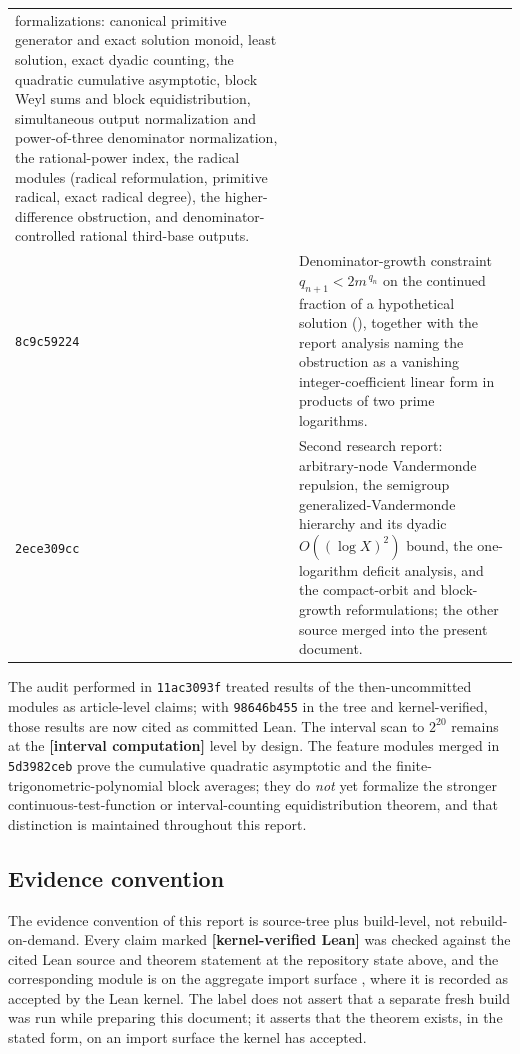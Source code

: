 \documentclass[11pt,oneside]{article}
\theoremstyle{definition}
\theoremstyle{remark}
\newcommand{\lean}[1]{\texttt{\detokenize{#1}}}
\newcommand{\commit}[1]{\texttt{#1}}
\newcommand{\statuslean}{\textcolor{leanblue}{\textbf{[kernel-verified Lean]}}}
\newcommand{\statuscomp}{\textcolor{computeviolet}{\textbf{[interval computation]}}}
\begin{document}
\begin{longtable}{@{}p{}p{}@{}}
formalizations: canonical primitive generator and exact solution monoid, least solution,
exact dyadic counting, the quadratic cumulative asymptotic, block Weyl sums and block
equidistribution, simultaneous output normalization and power-of-three denominator
normalization, the rational-power index, the radical modules (radical reformulation,
primitive radical, exact radical degree), the higher-difference obstruction, and
denominator-controlled rational third-base outputs. \\
\addlinespace
\commit{8c9c59224} & Denominator-growth constraint
$q_{n+1}<2m^{\,q_n}$ on the continued fraction of a hypothetical solution
(\lean{DenominatorGrowth}), together with the report analysis naming the obstruction as a
vanishing integer-coefficient linear form in products of two prime logarithms. \\
\addlinespace
\commit{2ece309cc} & Second research report: arbitrary-node Vandermonde repulsion, the
semigroup generalized-Vandermonde hierarchy and its dyadic $O((\log X)^2)$ bound, the
one-logarithm deficit analysis, and the compact-orbit and block-growth reformulations; the
other source merged into the present document. \\
\bottomrule
\end{longtable}

The audit performed in \commit{11ac3093f} treated results of the then-uncommitted modules as
article-level claims; with \commit{98646b455} in the tree and kernel-verified, those results
are now cited as committed Lean.  The interval scan to $2^{20}$ remains at the
\statuscomp{} level by design.  The feature modules merged in \commit{5d3982ceb} prove the
cumulative quadratic asymptotic and the finite-trigonometric-polynomial block averages; they
do \emph{not} yet formalize the stronger continuous-test-function or interval-counting
equidistribution theorem, and that distinction is maintained throughout this report.

\subsection{Evidence convention}
\label{pr:evidence-convention}

The evidence convention of this report is source-tree plus build-level, not
rebuild-on-demand.  Every claim marked \statuslean{} was checked against the cited Lean
source and theorem statement at the repository state above, and the corresponding module is
on the aggregate import surface \lean{ExponentialIdentities.lean}, where it is recorded as
accepted by the Lean kernel.  The label does not assert that a separate fresh build was run
while preparing this document; it asserts that the theorem exists, in the stated form, on an
import surface the kernel has accepted.
\end{document}
